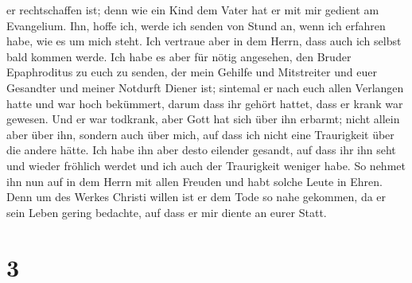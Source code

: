 er rechtschaffen ist; denn wie ein Kind dem Vater hat er mit mir gedient
am Evangelium.  Ihn, hoffe ich, werde ich senden von
Stund an, wenn ich erfahren habe, wie es um mich steht. 
Ich vertraue aber in dem Herrn, dass auch ich selbst bald kommen werde.
 Ich habe es aber für nötig angesehen, den Bruder
Epaphroditus zu euch zu senden, der mein Gehilfe und Mitstreiter und
euer Gesandter und meiner Notdurft Diener ist;  sintemal
er nach euch allen Verlangen hatte und war hoch bekümmert, darum dass
ihr gehört hattet, dass er krank war gewesen.  Und er war
todkrank, aber Gott hat sich über ihn erbarmt; nicht allein aber über
ihn, sondern auch über mich, auf dass ich nicht eine Traurigkeit über
die andere hätte.  Ich habe ihn aber desto eilender
gesandt, auf dass ihr ihn seht und wieder fröhlich werdet und ich auch
der Traurigkeit weniger habe.  So nehmet ihn nun auf in
dem Herrn mit allen Freuden und habt solche Leute in Ehren.
 Denn um des Werkes Christi willen ist er dem Tode so
nahe gekommen, da er sein Leben gering bedachte, auf dass er mir diente
an eurer Statt.

\hypertarget{section-2}{%
\section{3}\label{section-2}}

